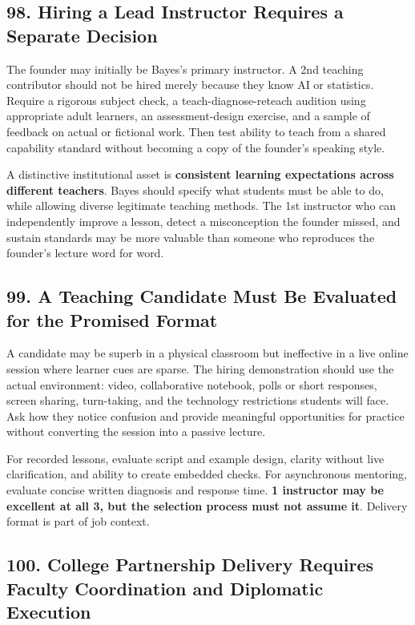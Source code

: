 \subsection*{98. Hiring a Lead Instructor Requires a Separate Decision}

The founder may initially be Bayes's primary instructor. A 2nd teaching contributor should not be hired merely because they know AI or statistics. Require a rigorous subject check, a teach-diagnose-reteach audition using appropriate adult learners, an assessment-design exercise, and a sample of feedback on actual or fictional work. Then test ability to teach from a shared capability standard without becoming a copy of the founder's speaking style.

A distinctive institutional asset is \textbf{consistent learning expectations across different teachers}. Bayes should specify what students must be able to do, while allowing diverse legitimate teaching methods. The 1st instructor who can independently improve a lesson, detect a misconception the founder missed, and sustain standards may be more valuable than someone who reproduces the founder's lecture word for word.

\subsection*{99. A Teaching Candidate Must Be Evaluated for the Promised Format}

A candidate may be superb in a physical classroom but ineffective in a live online session where learner cues are sparse. The hiring demonstration should use the actual environment: video, collaborative notebook, polls or short responses, screen sharing, turn-taking, and the technology restrictions students will face. Ask how they notice confusion and provide meaningful opportunities for practice without converting the session into a passive lecture.

For recorded lessons, evaluate script and example design, clarity without live clarification, and ability to create embedded checks. For asynchronous mentoring, evaluate concise written diagnosis and response time. \textbf{1 instructor may be excellent at all 3, but the selection process must not assume it}. Delivery format is part of job context.

\subsection*{100. College Partnership Delivery Requires Faculty Coordination and Diplomatic Execution}

